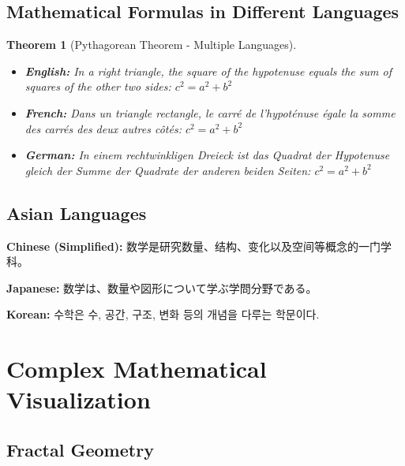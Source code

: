 \documentclass[12pt,a4paper,twoside]{article}
\newtheorem{theorem}{Theorem}[section]
\theoremstyle{definition}
\begin{document}
\subsection{Mathematical Formulas in Different Languages}

\begin{theorem}[Pythagorean Theorem - Multiple Languages]
\begin{itemize}
\item \textbf{English:} In a right triangle, the square of the hypotenuse equals the sum of squares of the other two sides: $c^2 = a^2 + b^2$
\item \textbf{French:} Dans un triangle rectangle, le carré de l'hypoténuse égale la somme des carrés des deux autres côtés: $c^2 = a^2 + b^2$
\item \textbf{German:} In einem rechtwinkligen Dreieck ist das Quadrat der Hypotenuse gleich der Summe der Quadrate der anderen beiden Seiten: $c^2 = a^2 + b^2$
\end{itemize}
\end{theorem}

\subsection{Asian Languages}

\begin{CJK}{UTF8}{gbsn}
\textbf{Chinese (Simplified):} 数学是研究数量、结构、变化以及空间等概念的一门学科。
\end{CJK}

\begin{CJK}{UTF8}{min}
\textbf{Japanese:} 数学は、数量や図形について学ぶ学問分野である。
\end{CJK}

\textbf{Korean:} 수학은 수, 공간, 구조, 변화 등의 개념을 다루는 학문이다.

\section{Complex Mathematical Visualization}

\subsection{Fractal Geometry}
\end{document}
